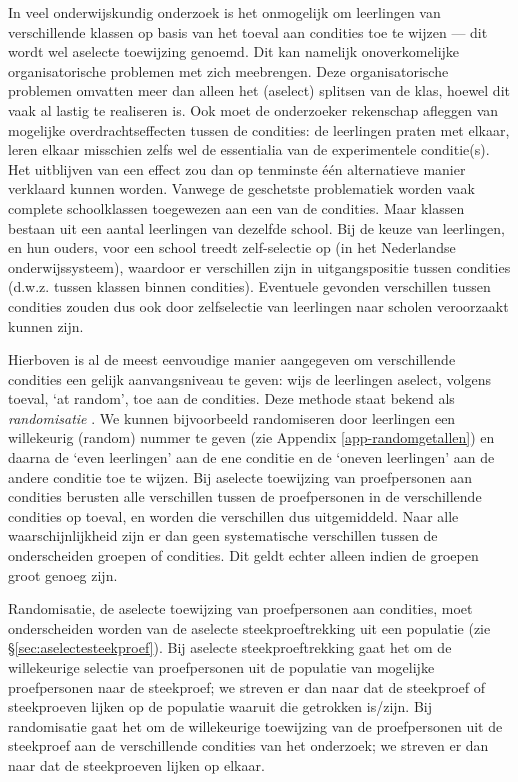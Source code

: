 \documentclass[
]{book}
\begin{document}
In veel onderwijskundig onderzoek is het onmogelijk om leerlingen van
verschillende klassen op basis van het toeval aan condities toe te
wijzen --- dit wordt wel aselecte toewijzing genoemd. Dit kan namelijk
onoverkomelijke organisatorische problemen met zich meebrengen. Deze
organisatorische problemen omvatten meer dan alleen het (aselect)
splitsen van de klas, hoewel dit vaak al lastig te realiseren is. Ook
moet de onderzoeker rekenschap afleggen van mogelijke
overdrachtseffecten tussen de condities: de leerlingen praten met
elkaar, leren elkaar misschien zelfs wel de essentialia van de
experimentele conditie(s). Het uitblijven van een effect zou dan op
tenminste één alternatieve manier verklaard kunnen worden. Vanwege de
geschetste problematiek worden vaak complete schoolklassen toegewezen
aan een van de condities. Maar klassen bestaan uit een aantal leerlingen
van dezelfde school. Bij de keuze van leerlingen, en hun ouders, voor
een school treedt zelf-selectie op (in het Nederlandse
onderwijssysteem), waardoor er verschillen zijn in uitgangspositie
tussen condities (d.w.z. tussen klassen binnen condities). Eventuele
gevonden verschillen tussen condities zouden dus ook door zelfselectie
van leerlingen naar scholen veroorzaakt kunnen zijn.

Hierboven is al de meest eenvoudige manier aangegeven om verschillende
condities een gelijk aanvangsniveau te geven: wijs de leerlingen
aselect, volgens toeval, `at random', toe aan de condities. Deze methode
staat bekend als \emph{randomisatie} \citep[p.294 ff]{SCC02}. We kunnen bijvoorbeeld
randomiseren door leerlingen een willekeurig (random) nummer te geven
(zie
Appendix \ref{app-randomgetallen}) en daarna de `even leerlingen' aan de
ene conditie en de `oneven leerlingen' aan de andere conditie toe te
wijzen. Bij aselecte toewijzing van proefpersonen aan condities berusten
alle verschillen tussen de proefpersonen in de verschillende condities
op toeval, en worden die verschillen dus uitgemiddeld. Naar alle
waarschijnlijkheid zijn er dan geen systematische verschillen tussen de
onderscheiden groepen of condities. Dit geldt echter alleen indien de
groepen groot genoeg zijn.

Randomisatie, de aselecte toewijzing van proefpersonen aan condities,
moet onderscheiden worden van de aselecte steekproeftrekking uit een
populatie (zie
§\ref{sec:aselectesteekproef}). Bij aselecte
steekproeftrekking gaat het om de willekeurige selectie van
proefpersonen uit de populatie van mogelijke proefpersonen naar de
steekproef; we streven er dan naar dat de steekproef of steekproeven
lijken op de populatie waaruit die getrokken is/zijn. Bij randomisatie
gaat het om de willekeurige toewijzing van de proefpersonen uit de
steekproef aan de verschillende condities van het onderzoek; we streven
er dan naar dat de steekproeven lijken op elkaar.
\end{document}
